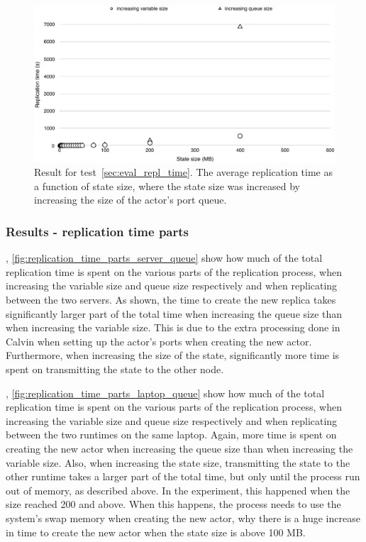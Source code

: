 \documentclass{cslthse-msc}
\begin{document}
\begin{figure}[hbt!]
\centering
\includegraphics[scale=0.5]{images/results/replication_time/laptop.pdf} 
\caption{Result for test~\ref{sec:eval_repl_time}. The average replication time as a function of state size, where the state size was increased by increasing the size of the actor's port queue.} \label{fig:replication_time_laptop}
\end{figure}

\subsubsection*{Results - replication time parts}
, \cref{fig:replication_time_parts_server_queue} show how much of the total replication time is spent on the various parts of the replication process, when increasing the variable size and queue size respectively and when replicating between the two servers. As shown, the time to create the new replica takes significantly larger part of the total time when increasing the queue size than when increasing the variable size. This is due to the extra processing done in Calvin when setting up the actor's ports when creating the new actor. Furthermore, when increasing the size of the state, significantly more time is spent on transmitting the state to the other node. 

, \cref{fig:replication_time_parts_laptop_queue} show how much of the total replication time is spent on the various parts of the replication process, when increasing the variable size and queue size respectively and when replicating between the two runtimes on the same laptop. Again, more time is spent on creating the new actor when increasing the queue size than when increasing the variable size. Also, when increasing the state size, transmitting the state to the other runtime takes a larger part of the total time, but only until the process run out of memory, as described above. In the experiment, this happened when the size reached 200 and above. When this happens, the process needs to use the system's swap memory when creating the new actor, why there is a huge increase in time to create the new actor when the state size is above 100 MB.
\end{document}
